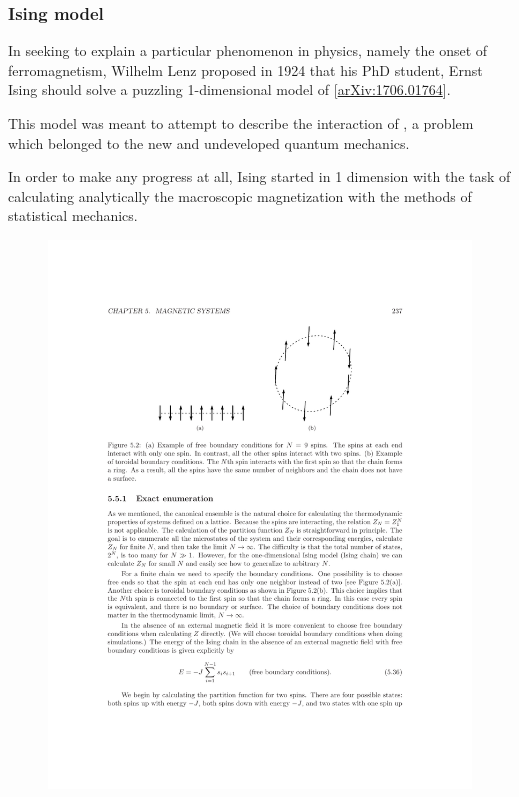 \documentclass[hyperref={colorlinks=true}]{beamer}
\begin{document}
\begin{frame}%
  \frametitle{Ising model}
  
  In seeking to explain a particular phenomenon in physics, namely the onset of ferromagnetism, Wilhelm Lenz proposed in 1924 that his PhD student, Ernst Ising should solve a puzzling 1-dimensional model of  [\href{https://arxiv.org/abs/1706.01764}{arXiv:1706.01764}]. 
  
  \vspace{0.3cm}
  
  This model was meant to attempt to describe the interaction of , a problem which belonged to the new and undeveloped quantum mechanics. 
  
  \vspace{0.3cm}
  
  In order to make any progress at all, Ising started in 1 dimension with the task of calculating analytically the macroscopic magnetization with the methods of statistical mechanics.
  
  \begin{figure}
    \centering
    \includegraphics[width=\textwidth]{Ising-spins-1D.pdf}
  \end{figure}
  

\end{frame}
\end{document}

